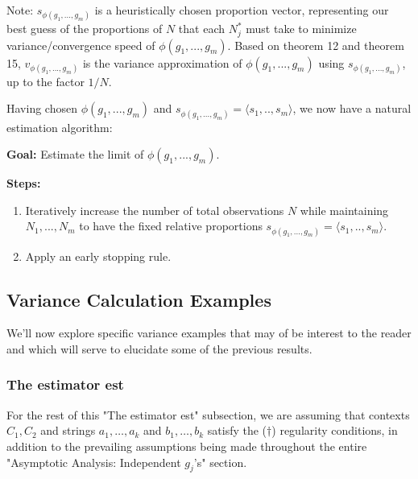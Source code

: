 \documentclass{article}
\begin{document}
Note: $\displaystyle s_{\phi \left( g_{1} ,...,g_{m}\right)}$ is a heuristically chosen proportion vector, representing our best guess of the proportions of $\displaystyle N$ that each $\displaystyle N_{j}^{*}$ must take to minimize variance/convergence speed of $\displaystyle \phi \left( g_{1} ,...,g_{m}\right)$. Based on theorem 12 and theorem 15, $\displaystyle v_{\phi \left( g_{1} ,...,g_{m}\right)}$ is the variance approximation of $\displaystyle \phi \left( g_{1} ,...,g_{m}\right)$ using $\displaystyle s_{\phi \left( g_{1} ,...,g_{m}\right)}$, up to the factor $\displaystyle 1/N$.



Having chosen $\displaystyle \phi \left( g_{1} ,...,g_{m}\right)$ and $\displaystyle s_{\phi \left( g_{1} ,...,g_{m}\right)} =\langle s_{1} ,..,s_{m} \rangle $, we now have a natural estimation algorithm:



\textbf{Goal:} Estimate the limit of $\displaystyle \phi \left( g_{1} ,...,g_{m}\right)$.

\textbf{Steps:}
\begin{enumerate}
\item Iteratively increase the number of total observations $\displaystyle N$ while maintaining $\displaystyle N_{1} ,...,N_{m}$ to have the fixed relative proportions $\displaystyle s_{\phi \left( g_{1} ,...,g_{m}\right)} =\langle s_{1} ,..,s_{m} \rangle $.
\item Apply an early stopping rule.
\end{enumerate}



\subsection{Variance Calculation Examples}

We'll now explore specific variance examples that may of be interest to the reader and which will serve to elucidate some of the previous results.



\subsubsection{The estimator est}
\begin{mdframed}
For the rest of this "The estimator est" subsection, we are assuming that contexts $C_1, C_2$ and strings $a_1, \dots, a_k$ and $b_1, \dots, b_k$ satisfy the ($\dagger$) regularity conditions, in addition to the prevailing assumptions being made throughout the entire "Asymptotic Analysis: Independent $g_j$'s" section.
\end{mdframed}
\end{document}
